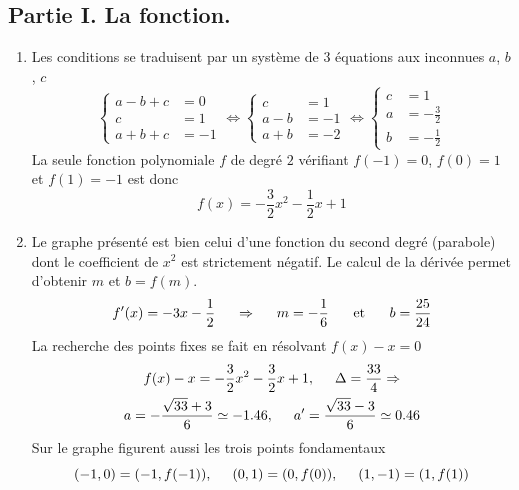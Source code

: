 \subsection*{Partie I. La fonction.}
\begin{enumerate}
  \item Les conditions se traduisent par un système de 3 équations aux inconnues $a$, $b$, $c$
\begin{displaymath}
  \left\lbrace  
  \begin{aligned}
    a - b + c &= 0 \\  c &= 1\\  a + b + c &= -1
  \end{aligned}
\right. 
\Leftrightarrow
  \left\lbrace  
  \begin{aligned}
    c &= 1\\ a - b &= -1 \\ a + b &= -2
  \end{aligned}
\right. 
\Leftrightarrow
  \left\lbrace  
  \begin{aligned}
    c &= 1\\ a &= -\frac{3}{2} \\ b &= -\frac{1}{2}
  \end{aligned}
\right. 
\end{displaymath}
La seule fonction polynomiale $f$ de degré $2$ vérifiant $f(-1)=0$, $f(0)=1$ et $f(1)=-1$ est donc
\begin{displaymath}
  f(x) = -\frac{3}{2}x^2 - \frac{1}{2}x + 1
\end{displaymath}

  \item Le graphe présenté est bien celui d'une fonction du second degré (parabole) dont le coefficient de $x^2$ est strictement négatif. Le calcul de la dérivée permet d'obtenir $m$ et $b=f(m)$.
\begin{displaymath}
  f'(x) = -3x - \frac{1}{2} \hspace{0.5cm}\Rightarrow \hspace{0.5cm} m = -\frac{1}{6} \hspace{0.5cm}\text{ et }\hspace{0.5cm} b = \frac{25}{24}
\end{displaymath}
La recherche des points fixes se fait en résolvant $f(x) -x=0$
\begin{multline*}
  f(x) -x = -\frac{3}{2}x^2 - \frac{3}{2}x + 1, \hspace{0.5cm} 
  \Delta = \frac{33}{4}\Rightarrow\\
  a = -\frac{\sqrt{33} + 3}{6}\simeq -1.46, \hspace{0.5cm} a' = \frac{\sqrt{33} - 3}{6}\simeq 0.46
\end{multline*}
Sur le graphe figurent aussi les trois points fondamentaux
\begin{displaymath}
(-1,0)=(-1,f(-1)),\hspace{0.5cm} (0,1)=(0,f(0)),\hspace{0.5cm}(1,-1)=(1,f(1))
\end{displaymath}


\end{enumerate}
